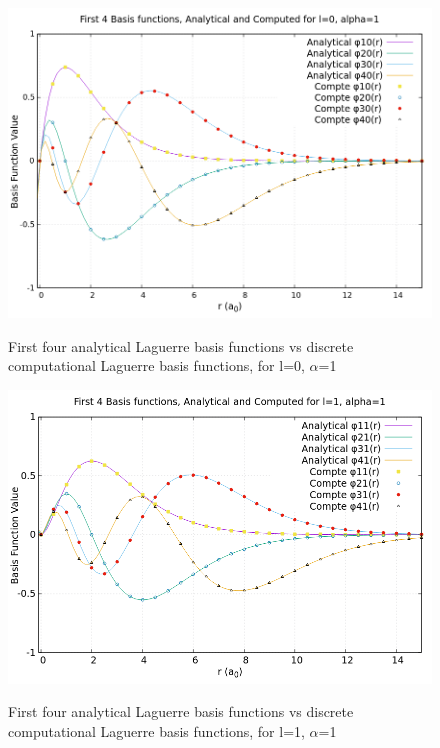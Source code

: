 \documentclass{article}
\begin{document}
    \begin{figure}[H]
    	\centering
    	\includegraphics[scale=0.6]{Images/l0a1.png}\\
    	\caption{First four analytical Laguerre basis functions vs discrete computational Laguerre basis functions, for l=0, $\alpha$=1}
    	\label{l0a1}
    \end{figure}
    \begin{figure}[H]
    	\centering
    	\includegraphics[scale=0.62]{Images/l1a1.png}\\
    	\caption{First four analytical Laguerre basis functions vs discrete computational Laguerre basis functions, for l=1, $\alpha$=1}
    	\label{l1a1}
    \end{figure}
\end{document}
